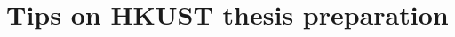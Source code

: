 \documentclass[a4paper]{ustthesis}
\begin{document}
\chapter{Tips on HKUST thesis preparation}
\label{chp_tips}
% 

\end{document}
